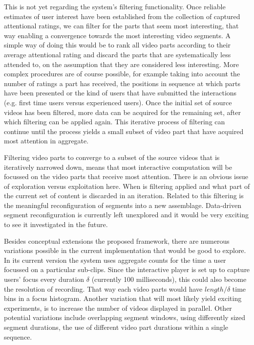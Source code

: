 This is not yet regarding the system's filtering functionality. Once reliable estimates of user interest have been established from the collection of captured attentional ratings, we can filter for the parts that seem most interesting, that way enabling a convergence towards the most interesting video segments. A simple way of doing this would be to rank all video parts according to their average attentional rating and discard the parts that are systematically less attended to, on the assumption that they are considered less interesting. More complex procedures are of course possible, for example taking into account the number of ratings a part has received, the positions in sequence at which parts have been presented or the kind of users that have submitted the interactions (e.g. first time users versus experienced users). Once the initial set of source videos has been filtered, more data can be acquired for the remaining set, after which filtering can be applied again. This iterative process of filtering can continue until the process yields a small subset of video part that have acquired most attention in aggregate.

Filtering video parts to converge to a subset of the source videos that is  iteratively narrowed down, means that most interactive computation will be focussed on the video parts that receive most attention. There is an obvious issue of exploration versus exploitation here. When is filtering applied and what part of the current set of content is discarded in an iteration. Related to this filtering is the meaningful reconfiguration of segments into a new assemblage. Data-driven segment reconfiguration is currently left unexplored and it would be very exciting to see it investigated in the future.

Besides conceptual extensions the proposed framework, there are numerous variations possible in the current implementation that would be good to explore. In its current version the system uses aggregate counts for the time a user focussed on a particular sub-clips. Since the interactive player is set up to capture users' focus every duration $\delta$ (currently 100 milliseconds), this could also become the resolution of recording. That way each video parts would have $length/\delta$ time bins in a focus histogram. Another variation that will most likely yield exciting experiments, is to increase the number of videos displayed in parallel. Other potential variations include overlapping segment windows, using differently sized segment durations, the use of different video part durations within a single sequence.